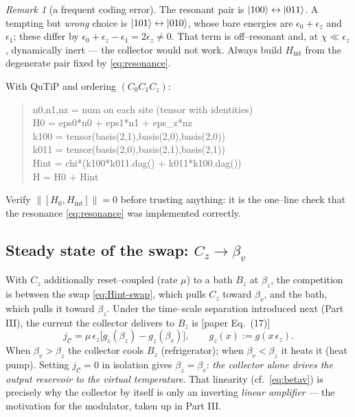 \documentclass[11pt,a4paper]{article}
\newcommand{\calC}{\mathcal{C}}
\newcommand{\gz}{g_z}
\theoremstyle{definition}
\theoremstyle{remark}
\newtheorem{remark}{Remark}[section]
\begin{document}
\begin{remark}[a frequent coding error]
The resonant pair is $\ket{100}\leftrightarrow\ket{011}$. A tempting but
\emph{wrong} choice is $\ket{101}\leftrightarrow\ket{010}$, whose bare
energies are $\epsilon_0+\epsilon_z$ and $\epsilon_1$; these differ by
$\epsilon_0+\epsilon_z-\epsilon_1 = 2\epsilon_z\neq0$. That term is
off--resonant and, at $\chi\ll\epsilon_z$, dynamically inert --- the
collector would not work. Always build $H_{\mathrm{int}}$ from the
degenerate pair fixed by \eqref{eq:resonance}.
\end{remark}

\begin{implbox}
With QuTiP and ordering $(C_0C_1C_z)$:
\begin{quote}\ttfamily
n0,n1,nz = num on each site (tensor with identities)\\
H0 = eps0*n0 + eps1*n1 + eps\_z*nz\\
k100 = tensor(basis(2,1),basis(2,0),basis(2,0))\\
k011 = tensor(basis(2,0),basis(2,1),basis(2,1))\\
Hint = chi*(k100*k011.dag() + k011*k100.dag())\\
H = H0 + Hint
\end{quote}
Verify $\|[H_0,H_{\mathrm{int}}]\|=0$ before trusting anything: it is the
one--line check that the resonance \eqref{eq:resonance} was implemented
correctly.
\end{implbox}

\subsection{Steady state of the swap: \texorpdfstring{$C_z\to\beta_v$}{Cz to betav}}
With $C_z$ additionally reset--coupled (rate $\mu$) to a bath $B_z$ at
$\beta_z$, the competition is between the swap
\eqref{eq:Hint-swap}, which pulls $C_z$ toward $\beta_v$, and the bath,
which pulls it toward $\beta_z$. Under the time--scale separation
introduced next (Part III), the current the collector delivers to $B_z$
is [paper Eq.~(17)]
\begin{equation}
\boxed{\; j_{\calC} = \mu\,\epsilon_z\big[\gz(\beta_z) - \gz(\beta_v)\big],
\qquad \gz(x):=g(x\,\epsilon_z). \;}
\label{eq:jC}
\end{equation}
When $\beta_v>\beta_z$ the collector cools $B_z$ (refrigerator); when
$\beta_v<\beta_z$ it heats it (heat pump). Setting $j_{\calC}=0$ in
isolation gives $\beta_z=\beta_v$: \emph{the collector alone drives the
output reservoir to the virtual temperature}. That linearity
(cf.\ \eqref{eq:betav}) is precisely why the collector by itself is only
an inverting \emph{linear amplifier} --- the motivation for the
modulator, taken up in Part III.
\end{document}
